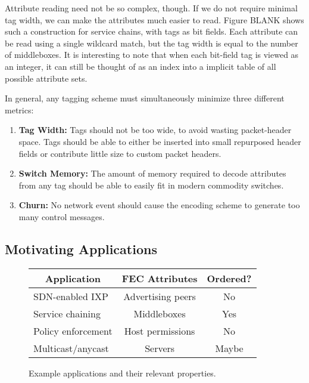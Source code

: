 
Attribute reading need not be so complex, though. If we do not require minimal
tag width, we can make the attributes much easier to read. Figure BLANK shows
such a construction for service chains, with tags as bit fields. Each attribute
can be read using a single wildcard match, but the tag width is equal to the
number of middleboxes. It is interesting to note that when each bit-field tag is
viewed as an integer, it can still be thought of as an index into a implicit
table of all possible attribute sets. 

In general, any tagging scheme must simultaneously minimize three different
metrics: \begin{enumerate} \item \textbf{Tag Width:} Tags should not be too
wide, to avoid wasting packet-header space.  Tags should be able to either be
inserted into small repurposed header fields or contribute little size to custom
packet headers.  \item \textbf{Switch Memory:} The amount of memory required to
decode attributes from any tag should be able to easily fit in modern commodity
switches.  \item \textbf{Churn:} No network event should cause the encoding
scheme to generate too many control messages.  \end{enumerate}


\subsection{Motivating Applications} 
\label{ssec:motivating-apps}

\begin{figure} \small \begin{center}
\begin{tabular}{|l|c|c|} \hline \multicolumn{1}{|c|}{\bf Application} &
\multicolumn{1}{c|}{\bf FEC Attributes} & \multicolumn{1}{c|}{\bf Ordered?}\\
\hline SDN-enabled IXP & Advertising peers & No \\ \hline Service chaining &
Middleboxes & Yes \\ \hline Policy enforcement & Host permissions & No \\ \hline
Multicast/anycast & Servers & Maybe \\ \hline \end{tabular} \end{center}
\caption{Example applications and their relevant properties. }
\label{tab:applications} \end{figure}


